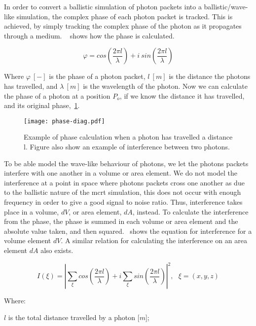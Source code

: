 In order to convert a ballistic simulation of photon packets into a ballistic/wave-like simulation, the complex phase of each photon packet is tracked.
This is achieved, by simply tracking the complex phase of the photon as it propagates through a medium.
~ shows how the phase is calculated.

\begin{equation}
    \varphi = cos\left(\frac{2 \pi l}{\lambda}\right) + i\ sin\left(\frac{2 \pi l}{\lambda}\right)
    \label{eqn:phase}
\end{equation}

Where $\varphi~[-]$ is the phase of a photon packet, $l\ [m]$ is the distance the photons has travelled, and $\lambda~[m]$ is the wavelength of the photon.
Now we can calculate the phase of a photon at a position $P_o$, if we know the distance it has travelled, and its original phase,~\cref{fig:phase-diag}.

\begin{figure}[!ht]
    \centering
    \texttt{[image: phase-diag.pdf]}
    \caption{Example of phase calculation when a photon has travelled a distance l. Figure also show an example of interference between two photons.}
    \label{fig:phase-diag}
\end{figure}

To be able model the wave-like behaviour of photons, we let the photons packets interfere with one another in a volume or area element. 
We do not model the interference at a point in space where photons packets cross one another as due to the ballistic nature of the \gls{mcrt} simulation, this does not occur with enough frequency in order to give a good signal to noise ratio. 
Thus, interference takes place in a volume, $dV$, or area element, $dA$, instead.
To calculate the interference from the phase, the phase is summed in each volume or area element and the absolute value taken, and then squared.~ shows the equation for interference for a volume element $dV$. A similar relation for calculating the interference on an area element $dA$ also exists.

\begin{equation}
I(\xi)=\left| \sum\limits_{\xi}cos\left(\frac{2\pi l}{\lambda}\right) + i \sum\limits_{\xi}sin\left(\frac{2\pi l}{\lambda}\right)\right|^2,\ \ \ \xi=(x,y,z)
\label{eqn:intense}
\end{equation}

\noindent Where:

\indent $l$ is the total distance travelled by a photon [$m$];

